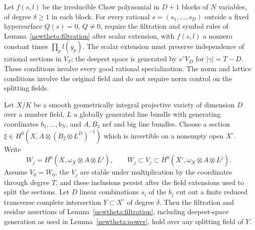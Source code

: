 Let \(f(s,l)\) be the irreducible Chow polynomial in \(D+1\)
blocks of \(N\) variables, of degree \(\delta\ge1\) in each block.
For every rational \(s=(s_1,\ldots,s_D)\) outside a fixed hypersurface
\(Q(s)=0\), \(Q\ne0\), require the filtration and symbol rules of
Lemma~\ref{newtheta:filtration} after scalar extension, with
\(f(s,l)\) a nonzero constant times \(\prod_p l(y_p)\). The scalar
extension must preserve independence of rational sections in \(V_T\);
the deepest space is generated by \(s^\gamma V_D\) for
\(|\gamma|=T-D\). These conditions involve every good rational
specialization. The norm and lattice conditions involve the original
field and do not require norm control on the splitting fields.

\begin{proposition}\label{newtheta:koszul}
Let \(X/K\) be a smooth geometrically integral projective variety of
dimension \(D\) over a number field, \(L\) a globally generated line
bundle with generating coordinates \(b_1,\ldots,b_N\), and \(A,B_2\)
nef and big line bundles. Choose a section
\(\xi\in H^0(X,A\otimes(B_2\otimes L^D)^{-1})\) which is invertible
on a nonempty open \(X^\circ\). Write
\[
 W_j=H^0(X,\omega_X\otimes A\otimes L^j),\qquad
 W_j\subset V_j\subset H^0(X^\circ,\omega_X\otimes A\otimes L^j).
\]
Assume \(V_0=W_0\), the \(V_j\) are stable under multiplication by the
coordinates through degree \(T\), and these inclusions persist after
the field extensions used to split the sections. Let \(D\) linear
combinations \(s_i\) of the \(b_j\) cut out a finite reduced transverse
complete intersection \(Y\subset X^\circ\) of degree \(\delta\).
Then the filtration and residue assertions of
Lemma~\ref{newtheta:filtration}, including deepest-space generation as
used in Lemma~\ref{newtheta:power}, hold over any splitting field of \(Y\).
\end{proposition}
